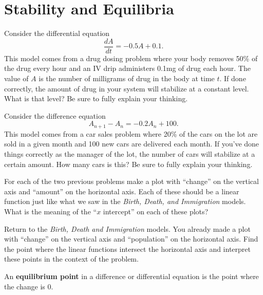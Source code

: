 \newpage\section{Stability and Equilibria}
\begin{problem}
    Consider the differential equation 
    \[ \frac{dA}{dt} = -0.5A + 0.1. \]
    This model comes from a drug dosing problem where your body removes 50\% of the drug
    every hour and an IV drip administers 0.1mg of drug each hour.  The value of $A$ is
    the number of milligrams of drug in the body at time $t$.  If done correctly, the
    amount of drug in your system will stabilize at a constant level.  What is that level?
    Be sure to fully explain your thinking.
\end{problem}

\begin{problem}
    Consider the difference equation
    \[ A_{n+1} - A_n = -0.2 A_n+ 100. \]
    This model comes from a car sales problem where 20\% of the cars on the lot are sold
    in a given month and 100 new cars are delivered each month.  If you've done things
    correctly as the manager of the lot, the number of cars will stabilize at a certain
    amount.  How many cars is this?  Be sure to fully explain your thinking.
\end{problem}

\begin{problem}
    For each of the two previous problems make a plot with ``change'' on the vertical axis
    and ``amount'' on the horizontal axis.  Each of these should be a linear function just
    like what we saw in the {\it Birth, Death, and Immigration} models.  What is the meaning of
    the ``$x$ intercept'' on each of these plots?
\end{problem}

\begin{problem}
    Return to the {\it Birth, Death and Immigration} models.  You already made a plot with
    ``change'' on the vertical axis and ``population'' on the horizontal axis.  Find the
    point where the linear functions intersect the horizontal axis and interpret these
    points in the context of the problem.
\end{problem}

\begin{definition}
    An {\bf equilibrium point} in a difference or differential equation is the point where
    the change is 0.
\end{definition}

